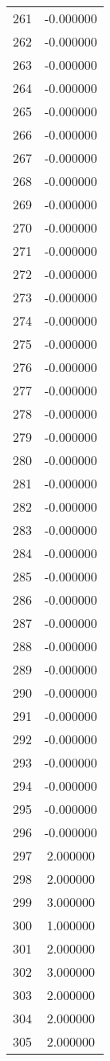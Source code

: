 \documentclass[12pt]{article}
\begin{document}
\begin{longtable}{@{}cc@{}}
261 & -0.000000 \\
262 & -0.000000 \\
263 & -0.000000 \\
264 & -0.000000 \\
265 & -0.000000 \\
266 & -0.000000 \\
267 & -0.000000 \\
268 & -0.000000 \\
269 & -0.000000 \\
270 & -0.000000 \\
271 & -0.000000 \\
272 & -0.000000 \\
273 & -0.000000 \\
274 & -0.000000 \\
275 & -0.000000 \\
276 & -0.000000 \\
277 & -0.000000 \\
278 & -0.000000 \\
279 & -0.000000 \\
280 & -0.000000 \\
281 & -0.000000 \\
282 & -0.000000 \\
283 & -0.000000 \\
284 & -0.000000 \\
285 & -0.000000 \\
286 & -0.000000 \\
287 & -0.000000 \\
288 & -0.000000 \\
289 & -0.000000 \\
290 & -0.000000 \\
291 & -0.000000 \\
292 & -0.000000 \\
293 & -0.000000 \\
294 & -0.000000 \\
295 & -0.000000 \\
296 & -0.000000 \\
297 & 2.000000 \\
298 & 2.000000 \\
299 & 3.000000 \\
300 & 1.000000 \\
301 & 2.000000 \\
302 & 3.000000 \\
303 & 2.000000 \\
304 & 2.000000 \\
305 & 2.000000 \\

\end{longtable}
\end{document}
